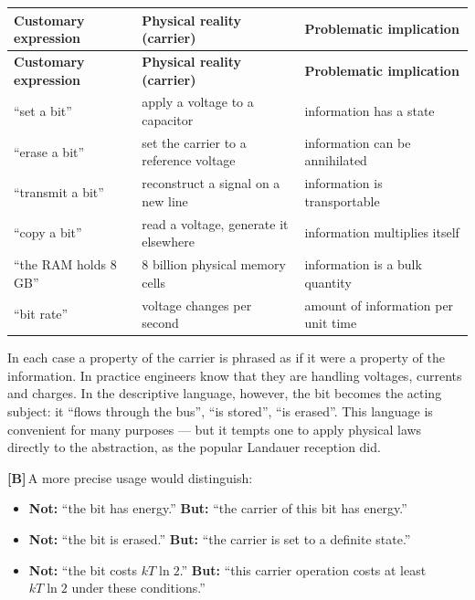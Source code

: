 \documentclass[11pt,a4paper]{article}
\newcommand{\LB}{\textcolor{layB}{\textbf{\footnotesize\textsf{[B]}}}\,}
\theoremstyle{ffgft}
\begin{document}
\begin{center}
\small
\begin{longtable}{@{}p{}p{}p{}@{}}
\toprule
\textbf{Customary expression} & \textbf{Physical reality (carrier)} & \textbf{Problematic implication} \\
\midrule
\endfirsthead
\toprule
\textbf{Customary expression} & \textbf{Physical reality (carrier)} & \textbf{Problematic implication} \\
\midrule
\endhead
“set a bit” & apply a voltage to a capacitor & information has a state \\
“erase a bit” & set the carrier to a reference voltage & information can be annihilated \\
“transmit a bit” & reconstruct a signal on a new line & information is transportable \\
“copy a bit” & read a voltage, generate it elsewhere & information multiplies itself \\
“the RAM holds 8\,GB” & 8 billion physical memory cells & information is a bulk quantity \\
“bit rate” & voltage changes per second & amount of information per unit time \\
\bottomrule
\end{longtable}
\end{center}

In each case a property of the carrier is phrased as if it were a property of the
information. In practice engineers know that they are handling voltages, currents
and charges. In the descriptive language, however, the bit becomes the acting
subject: it “flows through the bus”, “is stored”, “is erased”. This language is
convenient for many purposes --- but it tempts one to apply physical laws directly
to the abstraction, as the popular Landauer reception did.

\LB A more precise usage would distinguish:

\begin{itemize}[leftmargin=1.4em,itemsep=0.25em]
  \item \textbf{Not:} “the bit has energy.” \quad
        \textbf{But:} “the carrier of this bit has energy.”
  \item \textbf{Not:} “the bit is erased.” \quad
        \textbf{But:} “the carrier is set to a definite state.”
  \item \textbf{Not:} “the bit costs $kT\ln 2$.” \quad
        \textbf{But:} “this carrier operation costs at least $kT\ln 2$ under these
        conditions.”
\end{itemize}
\end{document}
